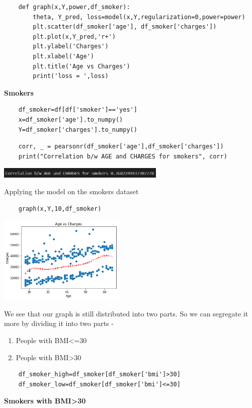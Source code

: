 \documentclass[12pt]{article}
\numberwithin{equation}{section}
\begin{document}
{\begin{lstlisting}
\end{lstlisting}
\begin{lstlisting}
	def graph(x,Y,power,df_smoker):
		theta, Y_pred, loss=model(x,Y,regularization=0,power=power)
		plt.scatter(df_smoker['age'], df_smoker['charges'])
		plt.plot(x,Y_pred,'r+')
		plt.ylabel('Charges')
		plt.xlabel('Age')
		plt.title('Age vs Charges')
		print('loss = ',loss)
\end{lstlisting}
\textbf{\large{Smokers}}
\begin{lstlisting}
	df_smoker=df[df['smoker']=='yes']
	x=df_smoker['age'].to_numpy()
	Y=df_smoker['charges'].to_numpy()
\end{lstlisting}
\begin{lstlisting}
	corr, _ = pearsonr(df_smoker['age'],df_smoker['charges'])
	print("Correlation b/w AGE and CHARGES for smokers", corr)
\end{lstlisting}
\begin{center}
\includegraphics[width=8cm]{work5}
\end{center}
Applying the model on the smokers dataset
\begin{lstlisting}
	graph(x,Y,10,df_smoker)
\end{lstlisting}
\begin{center}
\includegraphics[width=6cm]{work6}
\end{center}
We see that our graph is still distributed into two parts. So we can segregate it more by dividing it into two parts -
\begin{enumerate}
	\item People with BMI<=30
	\item People with BMI>30
\end{enumerate}
\begin{lstlisting}
	df_smoker_high=df_smoker[df_smoker['bmi']>30]
	df_smoker_low=df_smoker[df_smoker['bmi']<=30]
\end{lstlisting}
\textbf{\large{Smokers with BMI>30}}
\begin{lstlisting}

\end{lstlisting}}
\end{document}
